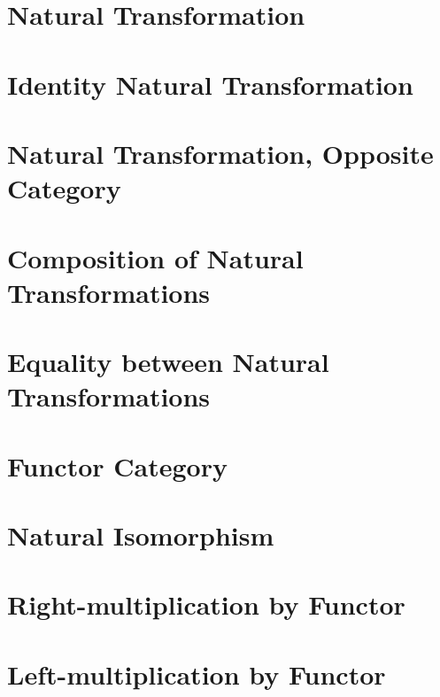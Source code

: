 \section{Natural Transformation}
    
\section{Identity Natural Transformation}
    
\section{Natural Transformation, Opposite Category}
    
\section{Composition of Natural Transformations}
    
\section{Equality between Natural Transformations}
    
\section{Functor Category}
    
\section{Natural Isomorphism}
    
\section{Right-multiplication by Functor}
\section{Left-multiplication by Functor}
